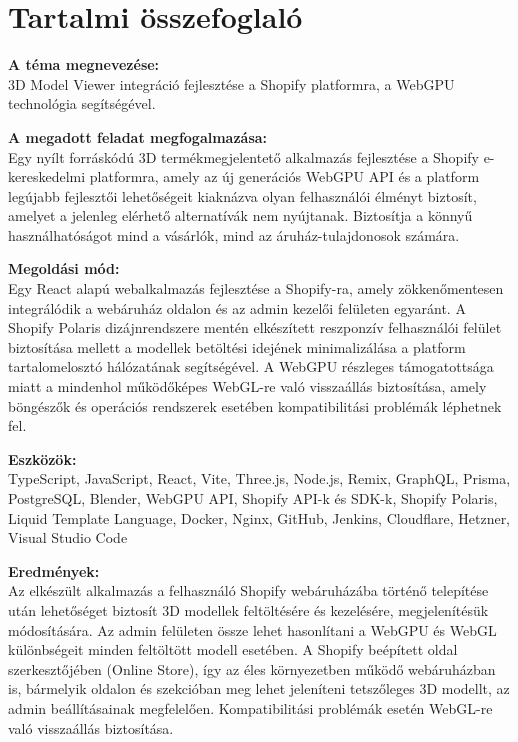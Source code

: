 \documentclass[12pt]{report}
\newcommand{\tartalmi}[1]{%
  \vspace{1em}%
  \noindent\textbf{#1:}\\%
}
\begin{document}
        \newpage
	\chapter*{Tartalmi összefoglaló}

        \tartalmi{A téma megnevezése}
        3D Model Viewer integráció fejlesztése a Shopify platformra, a WebGPU technológia segítségével.
        
        \tartalmi{A megadott feladat megfogalmazása}
        Egy nyílt forráskódú 3D termékmegjelentető alkalmazás fejlesztése a Shopify e-kereskedelmi platformra, amely az új generációs WebGPU API és a platform legújabb fejlesztői lehetőségeit kiaknázva olyan felhasználói élményt biztosít, amelyet a jelenleg elérhető alternatívák nem nyújtanak. Biztosítja a könnyű használhatóságot mind a vásárlók, mind az áruház-tulajdonosok számára.
        
        \tartalmi{Megoldási mód}
        Egy React alapú webalkalmazás fejlesztése a Shopify-ra, amely zökkenőmentesen integrálódik a webáruház oldalon és az admin kezelői felületen egyaránt. A Shopify Polaris dizájnrendszere mentén elkészített reszponzív felhasználói felület biztosítása mellett a modellek betöltési idejének minimalizálása a platform tartalomelosztó hálózatának segítségével. A WebGPU részleges támogatottsága miatt a mindenhol működőképes WebGL-re való visszaállás biztosítása, amely böngészők és operációs rendszerek esetében kompatibilitási problémák léphetnek fel. 
        
        \tartalmi{Eszközök}
        TypeScript, JavaScript, React, Vite, Three.js, Node.js, Remix, GraphQL, Prisma, PostgreSQL, Blender, WebGPU API, Shopify API-k és SDK-k, Shopify Polaris, Liquid Template Language, Docker, Nginx, GitHub, Jenkins, Cloudflare, Hetzner, Visual Studio Code 
        
        \tartalmi{Eredmények}
        Az elkészült alkalmazás a felhasználó Shopify webáruházába történő telepítése után lehetőséget biztosít 3D modellek feltöltésére és kezelésére, megjelenítésük módosítására. Az admin felületen össze lehet hasonlítani a WebGPU és WebGL különbségeit minden feltöltött modell esetében. A Shopify beépített oldal szerkesztőjében (Online Store), így az éles környezetben működő webáruházban is, bármelyik oldalon és szekcióban meg lehet jeleníteni tetszőleges 3D modellt, az admin beállításainak megfelelően. Kompatibilitási problémák esetén WebGL-re való visszaállás biztosítása.
        
\end{document}
